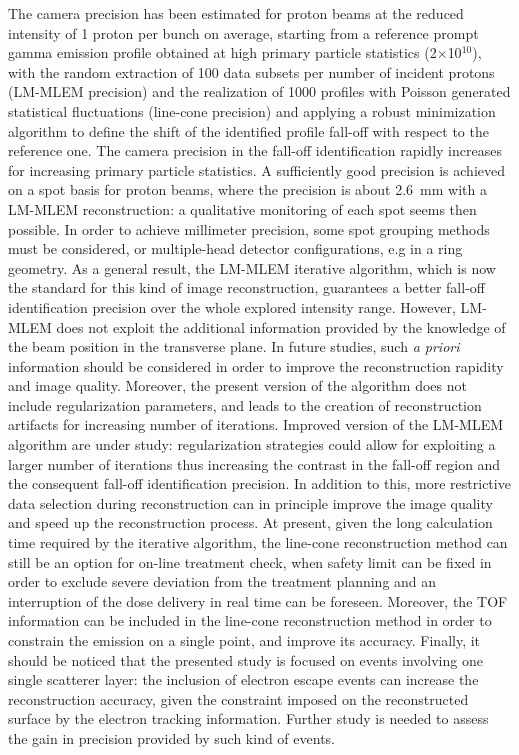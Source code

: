 The camera precision has been estimated for proton beams at the reduced intensity of 1 proton per bunch on average, starting from a reference prompt gamma emission profile obtained at high primary particle statistics (2$\times$10$^{10}$), with the random extraction of 100 data subsets per number of incident protons (LM-MLEM precision) and the realization of 1000 profiles with Poisson generated statistical fluctuations (line-cone precision) and applying a robust minimization algorithm to define the shift of the identified profile fall-off with respect to the reference one.
The camera precision in the fall-off identification rapidly increases for increasing primary particle statistics. A sufficiently good precision is achieved on a spot basis for proton beams, where the precision is about 2.6~mm with a LM-MLEM reconstruction: a qualitative monitoring of each spot seems then possible. In order to achieve millimeter precision, some spot grouping methods must be considered, or multiple-head detector configurations, e.g in a ring geometry. As a general result, the LM-MLEM iterative algorithm, which is now the standard for this kind of image reconstruction,  guarantees a better fall-off identification precision over the whole explored intensity range. However, LM-MLEM does not exploit the additional information provided by the knowledge of the beam position in the transverse plane. In future studies, such \textit{a priori} information should be considered in order to improve the reconstruction rapidity and image quality. Moreover, the present version of the algorithm does not include regularization parameters, and leads to the creation of reconstruction artifacts for increasing number of iterations. Improved version of the LM-MLEM algorithm are under study: regularization strategies could allow for exploiting a larger number of iterations thus increasing the contrast in the fall-off region and the consequent fall-off identification precision. In addition to this, more restrictive data selection during reconstruction can in principle improve the image quality and speed up the reconstruction process. At present, given the long calculation time required by the iterative algorithm, the line-cone reconstruction method can still be an option for on-line treatment check, when safety limit can be fixed in order to exclude severe deviation from the treatment planning and an interruption of the dose delivery in real time can be foreseen. Moreover, the TOF information can be included in the line-cone reconstruction method in order to constrain the emission on a single point, and improve its accuracy.
Finally, it should be noticed that the presented study is focused on events involving one single scatterer layer: the inclusion of electron escape events can increase the reconstruction accuracy, given the constraint imposed on the reconstructed surface by the electron tracking information. Further study is needed to assess the gain in precision provided by such kind of events. 

